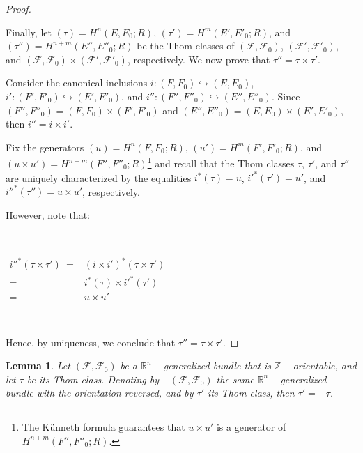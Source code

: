 \documentclass[12pt,oneside]{book}
\newtheorem{lem}    {Lemma}[chapter]
\newcommand{\R}{\mathbb{R}}
\newcommand{\Z}{\mathbb{Z}}
\begin{document}
\begin{proof}
        \

    	Finally, let $(\tau)=H^{n}(E,E_{0};R)$, $(\tau')=H^{m}(E',E'_{0};R)$, and $(\tau'')=H^{n+m}(E'',E''_{0};R)$ be the Thom classes of 
        $(\mathcal{F},\mathcal{F}_{0})$, $(\mathcal{F'},\mathcal{F'}_{0})$, and 
        $(\mathcal{F},\mathcal{F}_{0})\times (\mathcal{F'},\mathcal{F'}_{0})$, respectively. We now prove that $\tau''=\tau\times\tau'$.

    	Consider the canonical inclusions $i:(F,F_{0})\hookrightarrow (E,E_{0})$, $i':(F',F'_{0})\hookrightarrow (E',E'_{0})$, and 
        $i'':(F'',F''_{0})\hookrightarrow (E'',E''_{0})$. Since $(F'',F''_{0})=(F,F_{0})\times (F',F'_{0})$ and 
        $(E'',E''_{0})=(E,E_{0})\times (E',E'_{0})$, then $i''=i\times i'$.

    	Fix the generators $(u)=H^{n}(F,F_{0};R)$, $(u')=H^{m}(F',F'_{0};R)$, and 
        $(u\times u')=H^{n+m}(F'',F''_{0};R)$\footnote{The Künneth formula guarantees that $u\times u'$ is a generator 
        of $H^{n+m}(F'',F''_{0};R)$.} and recall that the Thom classes $\tau$, $\tau'$, and $\tau''$ are uniquely characterized by the 
        equalities $i^{*}(\tau)=u$, $i'^{*}(\tau')=u'$, and $i''^{*}(\tau'')=u\times u'$, respectively.

    	However, note that:

        \
    	
    	$\begin{array}{rl}
    		i''^{*}(\tau\times\tau') \ = & (i\times i')^{*}(\tau\times\tau') \\
    		= & i^{*}(\tau)\times i'^{*}(\tau') \\
    		= & u\times u'
    	\end{array}$

        \

    	Hence, by uniqueness, we conclude that $\tau''=\tau\times\tau'$.

    \end{proof}

    \begin{lem}\label{lema_thom_4}
    Let $(\mathcal{F},\mathcal{F}_{0})$ be a $\R^{n}-$generalized bundle that is $\Z-$orientable, and 
    let $\tau$ be its Thom class. Denoting by $-(\mathcal{F},\mathcal{F}_{0})$ the same $\R^{n}-$generalized bundle with 
    the orientation reversed, and by $\tau'$ its Thom class, then $\tau'=-\tau$.
    \end{lem}
\end{document}
